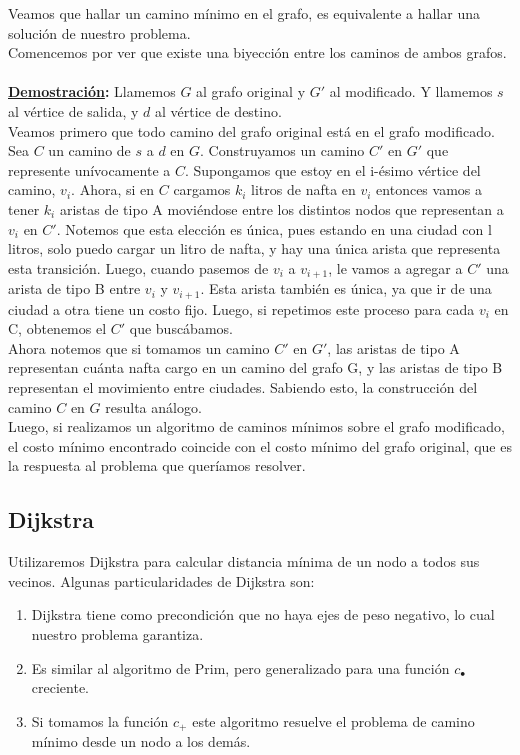 \indent Veamos que hallar un camino mínimo en el grafo, es equivalente a hallar una solución de nuestro problema. \\
\indent Comencemos por ver que existe una biyección entre los caminos de ambos grafos.\\ \\
\indent  \textbf{\underline{Demostración}:} Llamemos $G$ al grafo original y $G'$ al modificado. Y llamemos $s$ al vértice de salida, y $d$ al vértice de destino.\\
\indent Veamos primero que todo camino del grafo original está en el grafo modificado. \\
\indent Sea $C$ un camino de $s$ a $d$ en $G$. Construyamos un camino $C'$ en $G'$ que represente unívocamente a $C$. Supongamos que estoy en el i-ésimo vértice del camino, $v_{i}$. Ahora, si en $C$ cargamos $k_{i}$ litros de nafta en $v_{i}$ entonces vamos a tener $k_{i}$ aristas de tipo A moviéndose entre los distintos nodos que representan a $v_{i}$ en $C'$. Notemos que esta elección es única, pues estando en una ciudad con l litros, solo puedo cargar un litro de nafta, y hay una única arista que representa esta transición. Luego, cuando pasemos de $v_{i}$ a $v_{i+1}$, le vamos a agregar a $C'$ una arista de tipo B entre  $v_{i}$ y $v_{i+1}$. Esta arista también es única, ya que ir de una ciudad a otra tiene un costo fijo. Luego, si repetimos este proceso para cada $v_{i}$ en C, obtenemos el $C'$ que buscábamos. \\
\indent Ahora notemos que si tomamos un camino $C'$ en $G'$, las aristas de tipo A representan cuánta nafta cargo en un camino del grafo G, y las aristas de tipo B representan el movimiento entre ciudades. Sabiendo esto, la construcción del camino $C$ en $G$ resulta análogo. \\ %
\indent Luego, si realizamos un algoritmo de caminos mínimos sobre el grafo modificado, el costo mínimo encontrado coincide con el costo mínimo del grafo original, que es la respuesta al problema que queríamos resolver.

\subsection{Dijkstra}
Utilizaremos Dijkstra para calcular distancia mínima de un nodo a todos sus vecinos. Algunas particularidades de Dijkstra son:
\begin{enumerate}
\item Dijkstra tiene como precondición que no haya ejes de peso negativo, lo cual nuestro problema garantiza.
\item Es similar al algoritmo de Prim, pero generalizado para una función $c_{\bullet}$ creciente.
\item Si tomamos la función $c_{+}$ este algoritmo resuelve el problema de camino mínimo desde un nodo a los demás.
\end{enumerate}

